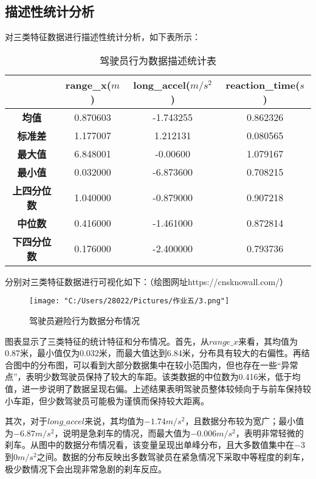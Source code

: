 \documentclass[withoutpreface,bwprint]{cumcmthesis}
\begin{document}
    \subsection{描述性统计分析}
    对三类特征数据进行描述性统计分析，如下表所示：\par
    \begin{table}[!htbp]
        \centering
        \caption{驾驶员行为数据描述统计表} %
        \begin{tabular}{cccc}
        \toprule[1.5pt]
         & \textbf{range\_x($m$)} & \textbf{long\_accel($m/s^2$)} & \textbf{reaction\_time($s$)} \\ \midrule
        \textbf{均值} & 0.870603 & -1.743255 & 0.862326 \\
        \textbf{标准差} & 1.177007 & 1.212131 & 0.080565 \\
        \textbf{最大值} & 6.848001 & -0.00600 & 1.079167 \\
        \textbf{最小值} & 0.032000 & -6.873600 & 0.708215 \\
        \textbf{上四分位数} & 1.040000 & -0.879000 & 0.907218 \\
        \textbf{中位数} & 0.416000 & -1.461000 & 0.872814 \\
        \textbf{下四分位数} & 0.176000 & -2.400000 & 0.793736 \\ \bottomrule[1.5pt]
        \end{tabular}
        \end{table}
    分别对三类特征数据进行可视化如下：（绘图网址https://cnsknowall.com/）\par
    \begin{figure}[!htbp] 
        \centering
        \texttt{[image: "C:/Users/28022/Pictures/作业五/3.png"]} 
        \caption{驾驶员避险行为数据分布情况} 
        \label{fig:example} 
    \end{figure}
    图表显示了三类特征的统计特征和分布情况。首先，从$range\_x$来看，其均值为0.87米，最小值仅为0.032米，而最大值达到6.84米，分布具有较大的右偏性。再结合图中的分布图，可以看到大部分数据集中在较小范围内，但也存在一些“异常点”，表明少数驾驶员保持了较大的车距。该类数据的中位数为0.416米，低于均值，进一步说明了数据呈现右偏。上述结果表明驾驶员整体较倾向于与前车保持较小车距，但少数驾驶员可能极为谨慎而保持较大距离。\par

    其次，对于$long\_accel$来说，其均值为$-1.74m/s^2$，且数据分布较为宽广；最小值为$-6.87 m/s^2$，说明是急刹车的情况，而最大值为$-0.006 m/s^2$，表明非常轻微的刹车。从图中的数据分布情况看，该变量呈现出单峰分布，且大多数值集中在$-3$到$0 m/s^2$之间。数据的分布反映出多数驾驶员在紧急情况下采取中等程度的刹车，极少数情况下会出现非常急剧的刹车反应。\par
    
\end{document}
